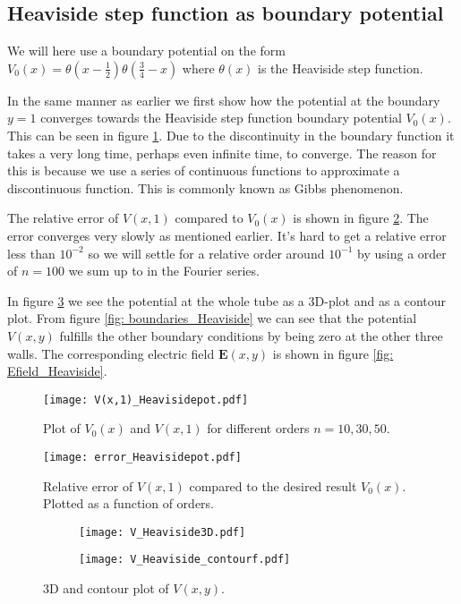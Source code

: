 \documentclass{article}
\begin{document}
\subsection*{Heaviside step function as boundary potential}
We will here use a boundary potential on the form $V_0(x) = \theta(x-\frac{1}{2})\theta(\frac{3}{4}-x)$ where $\theta(x)$ is the Heaviside step function. 

In the same manner as earlier we first show how the potential at the boundary $y=1$ converges towards the Heaviside step function boundary potential $V_0(x)$. This can be seen in figure \ref{fig: V(x,1)_Heavisidepot}. Due to the discontinuity in the boundary function it takes a very long time, perhaps even infinite time, to converge. The reason for this is because we use a series of continuous functions to approximate a discontinuous function. This is commonly known as Gibbs phenomenon. 

The relative error of $V(x,1)$ compared to $V_0(x)$ is shown in figure \ref{fig: error_Heavisidepot}. The error converges very slowly as mentioned earlier. It's hard to get a relative error less than $10^{-2}$ so we will settle for a relative order around $10^{-1}$ by using a order of $n=100$ we sum up to in the Fourier series. 

In figure \ref{fig: V_Heaviside} we see the potential at the whole tube as a 3D-plot and as a contour plot. From figure \ref{fig: boundaries_Heaviside} we can see that the potential $V(x,y)$ fulfills the other boundary conditions by being zero at the other three walls. The corresponding electric field $\boldsymbol{E}(x,y)$ is shown in figure \ref{fig: Efield_Heaviside}.

\begin{figure}[!htb]
\centering
\texttt{[image: V(x,1)\_Heavisidepot.pdf]}{}
\caption{Plot of $V_0(x)$ and $V(x,1)$ for different orders $n=10,30,50$. }
\label{fig: V(x,1)_Heavisidepot}
\end{figure}

\begin{figure}[!htb]
\centering
\texttt{[image: error\_Heavisidepot.pdf]}{}
\caption{Relative error of $V(x,1)$ compared to the desired result $V_0(x)$. Plotted as a function of orders. }
\label{fig: error_Heavisidepot}
\end{figure}

\begin{figure}[!htb]
     \centering
     \begin{subfigure}[b]{0.4\textwidth}
         \centering
         \texttt{[image: V\_Heaviside3D.pdf]}
     \end{subfigure}
    \hspace{6em}
     \begin{subfigure}[b]{0.4\textwidth}
         \centering
         \texttt{[image: V\_Heaviside\_contourf.pdf]}
     \end{subfigure}
    \caption{3D and contour plot of $V(x,y)$.}
    \label{fig: V_Heaviside}
\end{figure}
\end{document}
